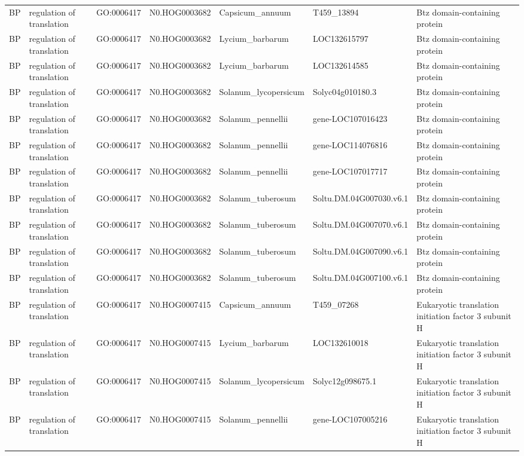 \begin{table}
\begin{tabular}[t]{lllllll}
BP & regulation of translation & GO:0006417 & N0.HOG0003682 & Capsicum\_annuum & T459\_13894 & Btz domain-containing protein\\
BP & regulation of translation & GO:0006417 & N0.HOG0003682 & Lycium\_barbarum & LOC132615797 & Btz domain-containing protein\\
BP & regulation of translation & GO:0006417 & N0.HOG0003682 & Lycium\_barbarum & LOC132614585 & Btz domain-containing protein\\
BP & regulation of translation & GO:0006417 & N0.HOG0003682 & Solanum\_lycopersicum & Solyc04g010180.3 & Btz domain-containing protein\\
BP & regulation of translation & GO:0006417 & N0.HOG0003682 & Solanum\_pennellii & gene-LOC107016423 & Btz domain-containing protein\\
BP & regulation of translation & GO:0006417 & N0.HOG0003682 & Solanum\_pennellii & gene-LOC114076816 & Btz domain-containing protein\\
BP & regulation of translation & GO:0006417 & N0.HOG0003682 & Solanum\_pennellii & gene-LOC107017717 & Btz domain-containing protein\\
BP & regulation of translation & GO:0006417 & N0.HOG0003682 & Solanum\_tuberosum & Soltu.DM.04G007030.v6.1 & Btz domain-containing protein\\
BP & regulation of translation & GO:0006417 & N0.HOG0003682 & Solanum\_tuberosum & Soltu.DM.04G007070.v6.1 & Btz domain-containing protein\\
BP & regulation of translation & GO:0006417 & N0.HOG0003682 & Solanum\_tuberosum & Soltu.DM.04G007090.v6.1 & Btz domain-containing protein\\
BP & regulation of translation & GO:0006417 & N0.HOG0003682 & Solanum\_tuberosum & Soltu.DM.04G007100.v6.1 & Btz domain-containing protein\\
BP & regulation of translation & GO:0006417 & N0.HOG0007415 & Capsicum\_annuum & T459\_07268 & Eukaryotic translation initiation factor 3 subunit H\\
BP & regulation of translation & GO:0006417 & N0.HOG0007415 & Lycium\_barbarum & LOC132610018 & Eukaryotic translation initiation factor 3 subunit H\\
BP & regulation of translation & GO:0006417 & N0.HOG0007415 & Solanum\_lycopersicum & Solyc12g098675.1 & Eukaryotic translation initiation factor 3 subunit H\\
BP & regulation of translation & GO:0006417 & N0.HOG0007415 & Solanum\_pennellii & gene-LOC107005216 & Eukaryotic translation initiation factor 3 subunit H\\

\end{tabular}
\end{table}
